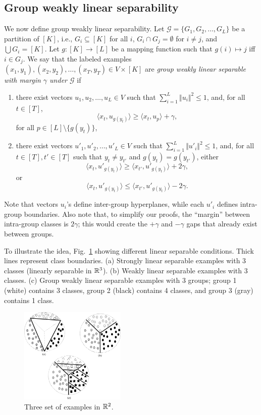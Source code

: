 \subsection{Group weakly linear separability}
We now define group weakly linear separability.
Let ${\mathcal G}=\{G_1,G_2,\ldots,G_L\}$ be a partition of $[K]$, i.e., $G_i\subseteq [K]$ for all $i$,
$G_i\cap G_j=\emptyset$ for $i\neq j$, and $\bigcup G_i = [K]$.  
Let $g:[K] \rightarrow [L]$ be a mapping function such that $g(i)\mapsto j$ iff $i\in G_j$.
We say that the labeled examples
$(x_1,y_1),(x_2,y_2),\ldots,(x_T,y_T)\in V\times[K]$
are {\em group weakly linear separable with margin $\gamma$ under ${\mathcal G}$} 
if 
\begin{enumerate}
\item there exist vectors $u_1,u_2,\ldots,u_L\in V$ such that
$\sum_{i=1}^L \Vert u_i \Vert^2\leq 1$, and, for all $t\in[T]$, 
\[
\langle x_t, u_{g(y_t)}\rangle \geq \langle x_t, u_p\rangle + \gamma,
\]
for all $p\in [L] \setminus\{g(y_t)\}$, 
%
\item there exist vectors $u'_1,u'_2,\ldots,u'_L\in V$ such that
$\sum_{i=1}^L \Vert u'_i \Vert^2\leq 1$, and, for all $t\in[T], t'\in[T]$ such that $y_t\neq y_{t'}$ and $g(y_t)=g(y_{t'})$,
either
\[
\langle x_t, u'_{g(y_t)}\rangle \geq \langle x_{t'}, u'_{g(y_t)}\rangle + 2\gamma,
\]
or
\[
\langle x_t, u'_{g(y_t)}\rangle \leq \langle x_{t'}, u'_{g(y_t)}\rangle - 2\gamma.
\]
\end{enumerate}

Note that vectors $u_i$'s define inter-group hyperplanes, while each
$u'_i$ defines intra-group boundaries.  Also note that, to simplify
our proofs, the ``margin'' between intra-group classes is $2\gamma$;
this would create the $+\gamma$ and $-\gamma$ gaps that already exist
between groups.

To illustrate the idea, Fig.~\ref{fig:sep-examples} showing different linear separable conditions.
Thick lines represent class boundaries. 
(a) Strongly linear separable examples with 3 classes (linearly separable in ${\mathbb{R}}^3$).  
(b) Weakly linear separable examples with 3 classes.  
(c) Group weakly linear separable examples with 3 groups; group 1 (white) contains 3 classes, group 2 (black) contains 4 classes, and group 3 (gray) contains 1 class.  

\begin{figure}[h]
\centering
\includegraphics[width=0.45\textwidth]{sep-examples.png}
\caption{Three set of examples in ${\mathbb{R}}^2$.}
\label{fig:sep-examples}
\end{figure}

